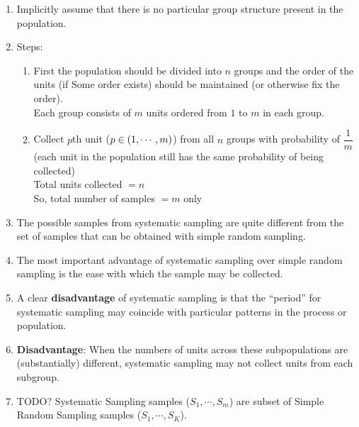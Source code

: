 \begin{enumerate}[itemsep=0.2cm]
    \item Implicitly assume that there is no particular group structure present in the population.
    \hfill \cite{statistics/book/Statistics-for-Data-Scientists/Maurits-Kaptein}

    \item Steps:
    \hfill \cite{statistics/book/Statistics-for-Data-Scientists/Maurits-Kaptein}
    \begin{enumerate}[itemsep=0.1cm]
        \item First the population should be divided into $n$ groups and the order of the units (if Some order exists) should be maintained (or otherwise fix the order).\\
        Each group consists of $m$ units ordered from $1$ to $m$ in each group.

        \item Collect $p$th unit ($p \in \left(1,\cdots,m\right)$) from all $n$ groups with probability of $\dfrac{1}{m}$\\
        (each unit in the population still has the same probability of being collected)\\
        Total units collected $= n$\\
        So, total number of samples $= m$ only

    \end{enumerate}

    \item The possible samples from systematic sampling are quite different from the set of samples that can be obtained with simple random sampling.
    \hfill \cite{statistics/book/Statistics-for-Data-Scientists/Maurits-Kaptein}

    \item The most important advantage of systematic sampling over simple random sampling is the ease with which the sample may be collected.
    \hfill \cite{statistics/book/Statistics-for-Data-Scientists/Maurits-Kaptein}

    \item A clear \textbf{disadvantage} of systematic sampling is that the “period” for systematic sampling may coincide with particular patterns in the process or population.
    \hfill \cite{statistics/book/Statistics-for-Data-Scientists/Maurits-Kaptein}

    \item \textbf{Disadvantage}: When the numbers of units across these subpopulations are (substantially) different, systematic sampling may not collect units from each subgroup.
    \hfill \cite{statistics/book/Statistics-for-Data-Scientists/Maurits-Kaptein}

    \item TODO? Systematic Sampling samples ($S_1,\cdots,S_m$) are subset of Simple Random Sampling samples ($S_1,\cdots,S_K$).
\end{enumerate}

